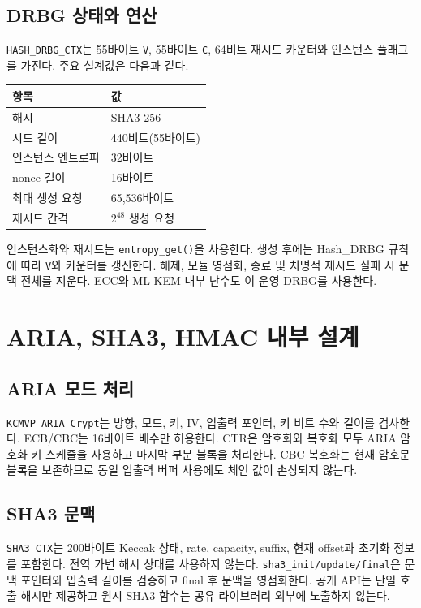 \documentclass[11pt,a4paper]{article}
\begin{document}
\subsection{DRBG 상태와 연산}

\texttt{HASH\_DRBG\_CTX}는 55바이트 \texttt{V}, 55바이트 \texttt{C},
64비트 재시드 카운터와 인스턴스 플래그를 가진다. 주요 설계값은 다음과 같다.

\begin{center}
\begin{tabular}{ll}
\toprule
항목 & 값 \\
\midrule
해시 & SHA3-256 \\
시드 길이 & 440비트(55바이트) \\
인스턴스 엔트로피 & 32바이트 \\
nonce 길이 & 16바이트 \\
최대 생성 요청 & 65,536바이트 \\
재시드 간격 & $2^{48}$ 생성 요청 \\
\bottomrule
\end{tabular}
\end{center}

인스턴스화와 재시드는 \texttt{entropy\_get()}을 사용한다. 생성 후에는
Hash\_DRBG 규칙에 따라 \texttt{V}와 카운터를 갱신한다. 해제, 모듈 영점화,
종료 및 치명적 재시드 실패 시 문맥 전체를 지운다. ECC와 ML-KEM 내부 난수도
이 운영 DRBG를 사용한다.

\section{ARIA, SHA3, HMAC 내부 설계}

\subsection{ARIA 모드 처리}

\texttt{KCMVP\_ARIA\_Crypt}는 방향, 모드, 키, IV, 입출력 포인터, 키 비트 수와
길이를 검사한다. ECB/CBC는 16바이트 배수만 허용한다. CTR은 암호화와 복호화
모두 ARIA 암호화 키 스케줄을 사용하고 마지막 부분 블록을 처리한다. CBC
복호화는 현재 암호문 블록을 보존하므로 동일 입출력 버퍼 사용에도 체인 값이
손상되지 않는다.

\subsection{SHA3 문맥}

\texttt{SHA3\_CTX}는 200바이트 Keccak 상태, rate, capacity, suffix, 현재
offset과 초기화 정보를 포함한다. 전역 가변 해시 상태를 사용하지 않는다.
\texttt{sha3\_init/update/final}은 문맥 포인터와 입출력 길이를 검증하고
final 후 문맥을 영점화한다. 공개 API는 단일 호출 해시만 제공하고 원시 SHA3
함수는 공유 라이브러리 외부에 노출하지 않는다.
\end{document}
